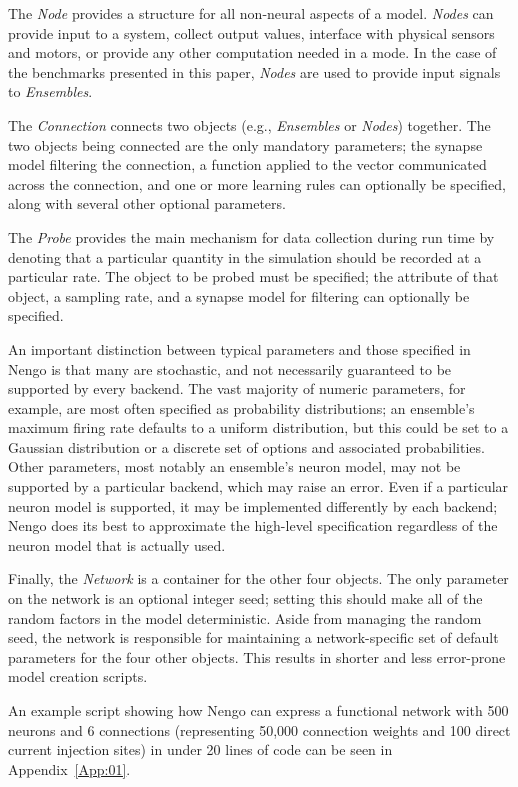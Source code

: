 \documentclass{frontiersSCNS}
\begin{document}
The \textit{Node} provides a structure for all
non-neural aspects of a model.
\textit{Nodes} can provide input to a system,
collect output values,
interface with physical sensors and motors,
or provide any other computation needed in a mode.
In the case of the benchmarks presented in this paper,
\textit{Nodes} are used to provide input signals
to \textit{Ensembles}.

The \textit{Connection} connects two objects
(e.g., \textit{Ensembles} or \textit{Nodes}) together.
The two objects being connected are the only mandatory parameters;
the synapse model filtering the connection,
a function applied to the vector
communicated across the connection,
and one or more learning rules
can optionally be specified,
along with several other optional parameters.

The \textit{Probe} provides the main mechanism
for data collection during run time
by denoting that a particular
quantity in the simulation should be recorded
at a particular rate.
The object to be probed must be specified;
the attribute of that object,
a sampling rate, and a synapse model for filtering
can optionally be specified.

An important distinction between typical
parameters and those specified in Nengo
is that many are stochastic,
and not necessarily guaranteed
to be supported by every backend.
The vast majority of numeric parameters,
for example,
are most often specified as probability distributions;
an ensemble's maximum firing rate defaults to
a uniform distribution,
but this could be set to a Gaussian distribution
or a discrete set of options and associated
probabilities.
Other parameters,
most notably an ensemble's neuron model,
may not be supported by a particular backend,
which may raise an error.
Even if a particular neuron model is supported,
it may be implemented differently by each backend;
Nengo does its best to approximate
the high-level specification regardless of
the neuron model that is actually used.

Finally, the \textit{Network} is a
container for the other four objects.
The only parameter on the network
is an optional integer seed;
setting this should make
all of the random factors
in the model deterministic.
Aside from managing the random seed,
the network is responsible for maintaining
a network-specific set of default parameters
for the four other objects.
This results in shorter and less error-prone
model creation scripts.

An example script showing how Nengo can
express a functional network
with 500 neurons and 6 connections
(representing 50,000 connection weights
and 100 direct current injection sites)
in under 20 lines of code
can be seen in Appendix~\ref{App:01}.
\end{document}
